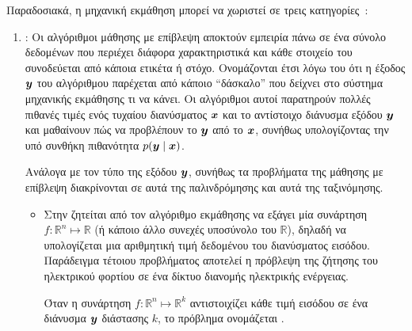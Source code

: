 Παραδοσιακά, η μηχανική εκμάθηση μπορεί να χωριστεί σε τρεις κατηγορίες~\cite{Goodfellow-et-al-2016}:
\begin{enumerate}
    \item {}:
          Οι αλγόριθμοι μάθησης με επίβλεψη αποκτούν εμπειρία πάνω σε ένα σύνολο δεδομένων που περιέχει διάφορα χαρακτηριστικά και κάθε στοιχείο του συνοδεύεται από κάποια ετικέτα ή στόχο.
          Ονομάζονται έτσι λόγω του ότι η έξοδος $\vy$ του αλγόριθμου παρέχεται από κάποιο \enquote{δάσκαλο} που δείχνει στο σύστημα μηχανικής εκμάθησης τι να κάνει.
          Οι αλγόριθμοι αυτοί παρατηρούν πολλές πιθανές τιμές ενός τυχαίου διανύσματος $\vx$ και το αντίστοιχο διάνυσμα εξόδου $\vy$ και μαθαίνουν πώς να προβλέπουν το $\vy$ από το $\vx$,
          συνήθως υπολογίζοντας την υπό συνθήκη πιθανότητα $p(\vy \mid \vx)$.

          Ανάλογα με τον τύπο της εξόδου $\vy$, συνήθως τα προβλήματα της μάθησης με επίβλεψη διακρίνονται σε αυτά της παλινδρόμησης και αυτά της ταξινόμησης.
          \begin{itemize}
              \item Στην 
                    ζητείται από τον αλγόριθμο εκμάθησης να εξάγει μία συνάρτηση $f : \mathbb{R}^n \mapsto \mathbb{R}$
                    (ή κάποιο άλλο συνεχές υποσύνολο του $\mathbb{R}$),
                    δηλαδή να υπολογίζεται μια αριθμητική τιμή δεδομένου του διανύσματος εισόδου.
                    Παράδειγμα τέτοιου προβλήματος αποτελεί η πρόβλεψη της ζήτησης του ηλεκτρικού φορτίου σε ένα δίκτυο διανομής ηλεκτρικής ενέργειας.

                    Όταν η συνάρτηση $f : \mathbb{R}^n \mapsto \mathbb{R}^k$ αντιστοιχίζει κάθε τιμή εισόδου σε ένα διάνυσμα $\vy$ διάστασης $k$,
                    το πρόβλημα ονομάζεται .


\end{itemize}
\end{enumerate}
